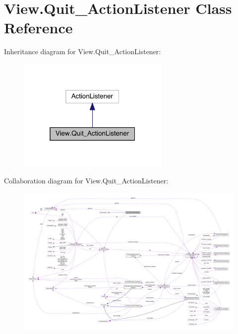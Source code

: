 \hypertarget{class_view_1_1_quit___action_listener}{}\section{View.\+Quit\+\_\+\+Action\+Listener Class Reference}
\label{class_view_1_1_quit___action_listener}


Inheritance diagram for View.\+Quit\+\_\+\+Action\+Listener\+:
\nopagebreak
\begin{figure}[H]
\begin{center}
\leavevmode
\includegraphics[width=208pt]{class_view_1_1_quit___action_listener__inherit__graph}
\end{center}
\end{figure}


Collaboration diagram for View.\+Quit\+\_\+\+Action\+Listener\+:
\nopagebreak
\begin{figure}[H]
\begin{center}
\leavevmode
\includegraphics[width=350pt]{class_view_1_1_quit___action_listener__coll__graph}
\end{center}
\end{figure}
